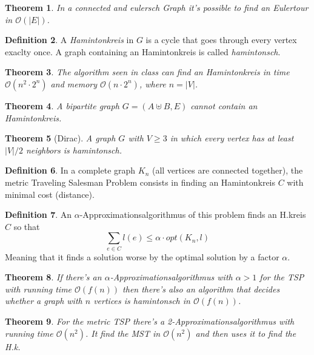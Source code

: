 \documentclass[12pt]{extarticle}
\theoremstyle{definition}
\newtheorem{definition}{Definition}[section]
\theoremstyle{remark}
\theoremstyle{plain}
\newtheorem{theorem}[definition]{Theorem}
\theoremstyle{plain}
\theoremstyle{plain}
\newcommand{\BO}{\mathcal{O}}
\begin{document}
\begin{theorem}
    In a connected and eulersch Graph it's possible to find an Eulertour in $\BO(|E|)$.
\end{theorem}

\begin{definition}
    A \textit{Hamintonkreis} in $G$ is a cycle that goes through every vertex exaclty once.
    A graph containing an Hamintonkreis is called \textit{hamintonsch}.
\end{definition}

\begin{theorem}
    The algorithm seen in class can find an Hamintonkreis in time $\BO(n^2 \cdot 2^n)$ and memory $\BO(n \cdot 2^n)$, where $n = |V|$.
\end{theorem}

\begin{theorem}
    A bipartite graph $G = (A \uplus B, E)$ cannot contain an Hamintonkreis.
\end{theorem}

\begin{theorem}[Dirac]
    A graph $G$ with $V \ge 3$ in which every vertex has at least $|V|/2$ neighbors is \textit{hamintonsch}.
\end{theorem}

\begin{definition}
    In a complete graph $K_n$ (all vertices are connected together),
    the metric Traveling Salesman Problem consists in finding an
    Hamintonkreis $C$ with minimal cost (distance).
\end{definition}

\begin{definition}
    An $\alpha$-Approximationsalgorithmus of this problem finds an H.kreis $C$ so that
    \[ \sum_{e \in C} l(e) \le \alpha \cdot opt(K_n, l) \]
    Meaning that it finds a solution worse by the optimal solution by a factor $\alpha$.
\end{definition}

\begin{theorem}
    If there's an $\alpha$-Approximationsalgorithmus with $\alpha > 1$ for the TSP with running time $\BO(f(n))$ then there's
    also an algorithm that decides whether a graph with $n$ vertices is hamintonsch in $\BO(f(n))$.
\end{theorem}
\begin{theorem}
    For the metric TSP there's a 2-Approximationsalgorithmus with running time $\BO(n^2)$.
    It find the MST in $\BO(n^2)$ and then uses it to find the H.k.
\end{theorem}
\end{document}
